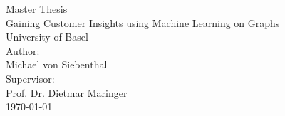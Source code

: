 \documentclass[12pt]{article}
\begin{document}
  
  \begin{titlepage}
    \begin{center}
      \vspace{1em}
	  \large{Master Thesis}\\
	  \huge Gaining Customer Insights using Machine Learning on Graphs \\ 
	  \large \vspace{1em}
	  University of Basel\\
	  \vspace{4em} 
	  \large
	  Author: \\
	  Michael von Siebenthal\\
	  \vspace{2em}
	  Supervisor: \\
	  Prof. Dr. Dietmar Maringer\\
	  \vspace{2em}
	  \today
	  \vspace{3em}
    \end{center}
  \end{titlepage} 



  
  
  

  \tableofcontents
  \listoffigures
  \listoftables

  \onehalfspacing
  
  


  
  \label{section:theory}
 

  
  \label{section:data}



   

  \appendix
  
\end{document}
